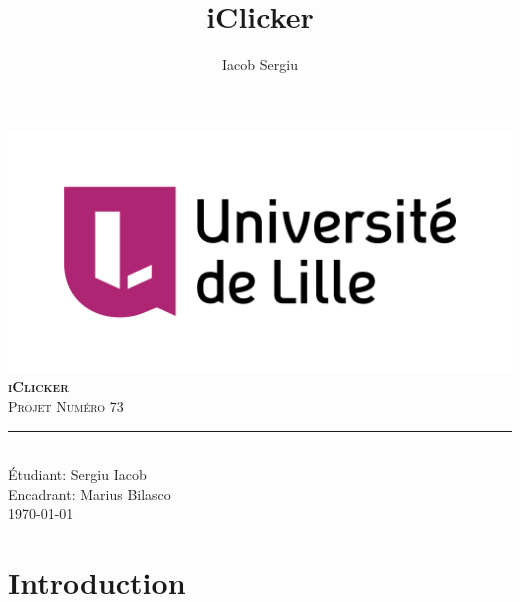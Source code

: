 \documentclass[11pt,titlepage]{report}
\author{Iacob Sergiu}
\title{iClicker}
\begin{document}
\begin{titlepage}
    \centering
    \includegraphics[width=0.75\linewidth]{universite_de_lille.png}\\[0.25cm]
    \vspace{\fill}
    \textbf{\textsc{\fontsize{50}{50}\selectfont iClicker}}\\ \vspace{\fill}		
	\textsc{\LARGE Projet Numéro 73}\\[0.4cm]
    \rule{\linewidth}{0.2 mm}\\[0.5 cm]
    Étudiant: Sergiu Iacob
    \\
    Encadrant: Marius Bilasco
    \\
    \vspace{\fill}
    \monthyeardate\today
\end{titlepage}
\restoregeometry

{\pagestyle{plain}
\tableofcontents
\cleardoublepage}

\chapter{Introduction}


% 

% 

% 
\end{document}
